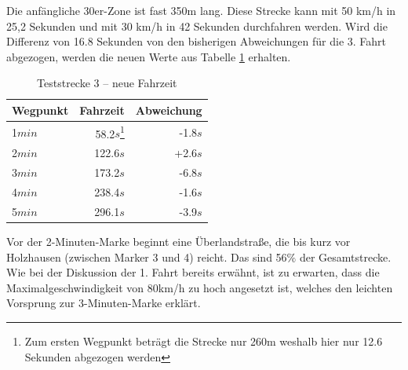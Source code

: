 Die anfängliche 30er-Zone ist fast 350m lang.
Diese Strecke kann mit 50 km/h in 25,2 Sekunden und mit 30 km/h in 42 Sekunden durchfahren werden.
Wird die Differenz von 16.8 Sekunden von den bisherigen Abweichungen für die 3. Fahrt abgezogen, werden die neuen Werte aus Tabelle \ref{tab:new3} erhalten.

\begin{table}[htb]
\centering
\caption{Teststrecke 3 -- neue Fahrzeit}
\label{tab:new3}
\begin{tabular}{|l|r|r|}
\hline
Wegpunkt & Fahrzeit & Abweichung \\ \hline 
1$min$ & 58.2$s$\footnote{Zum ersten Wegpunkt beträgt die Strecke nur 260m weshalb hier nur 12.6 Sekunden abgezogen werden} & -1.8$s$  \\
2$min$ & 122.6$s$ & +2.6$s$  \\
3$min$ & 173.2$s$ & -6.8$s$  \\
4$min$ & 238.4$s$ & -1.6$s$  \\
5$min$ & 296.1$s$ & -3.9$s$  \\
\hline
\end{tabular}
\end{table}

Vor der 2-Minuten-Marke beginnt eine Überlandstraße, die bis kurz vor Holzhausen (zwischen Marker 3 und 4) reicht.
Das sind 56$\%$ der Gesamtstrecke.
Wie bei der Diskussion der 1. Fahrt bereits erwähnt, ist zu erwarten, dass die Maximalgeschwindigkeit von 80km/h zu hoch angesetzt ist, welches den leichten Vorsprung zur 3-Minuten-Marke erklärt.

